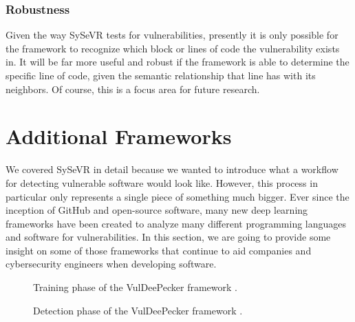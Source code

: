 \documentclass[12pt,twocolumn,letterpaper]{article}
\begin{document}
\subsubsection{Robustness}
Given the way SySeVR tests for vulnerabilities, presently it is only possible for the framework to recognize which
block or lines of code the vulnerability exists in. It will be far more useful and robust if the framework is able to
determine the specific line of code, given the semantic relationship that line has with its neighbors. Of course, this is
a focus area for future research.

\section{Additional Frameworks}
\label{sec:additional-frameworks}

We covered SySeVR in detail because we wanted to introduce what a workflow for detecting vulnerable 
software would look like. However, this process in particular only represents a single piece of something 
much bigger. Ever since the inception of GitHub and open-source software, many new deep learning frameworks have been 
created to analyze many different programming languages and software for vulnerabilities. In this section, 
we are going to provide some insight on some of those frameworks that continue to aid companies and cybersecurity engineers 
when developing software.

\begin{figure}[h!]
    \centering

    \caption{Training phase of the VulDeePecker framework \cite{Zou21}.}
    \label{fig:af-0}
\end{figure}

\begin{figure}[h!]
    \centering

    \caption{Detection phase of the VulDeePecker framework \cite{Zou21}.}
    \label{fig:af-1}
\end{figure}
\end{document}
